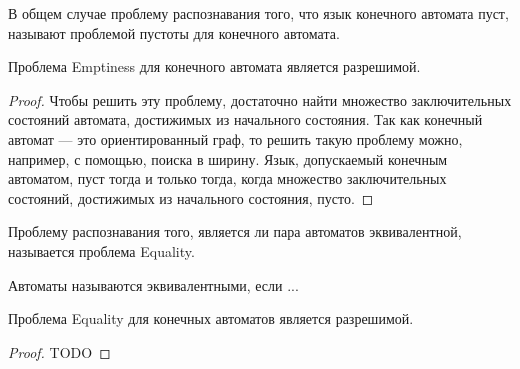     \begin{Def}
         В общем случае проблему распознавания того, что язык конечного автомата пуст, называют проблемой пустоты для конечного автомата. 
    \end{Def}
    \begin{Thm}
        Проблема Emptiness для конечного автомата является разрешимой.
    \end{Thm}
    \begin{proof}
        Чтобы решить эту проблему, достаточно найти множество заключительных состояний автомата, достижимых из начального состояния. Так как конечный автомат — это ориентированный граф, то решить такую проблему можно, например, с помощью, поиска в ширину. Язык, допускаемый конечным автоматом, пуст тогда и только тогда, когда множество заключительных состояний, достижимых из начального состояния, пусто.
    \end{proof}
    \begin{Def}
        Проблему распознавания того, является ли пара автоматов эквивалентной, называется проблема Equality.
    \end{Def}
    \begin{Rem}
        Автоматы называются эквивалентными, если ...
    \end{Rem}
    \begin{Thm}
        Проблема Equality для конечных автоматов является разрешимой.
    \end{Thm}
    \begin{proof}
        TODO
    \end{proof}

    
    
